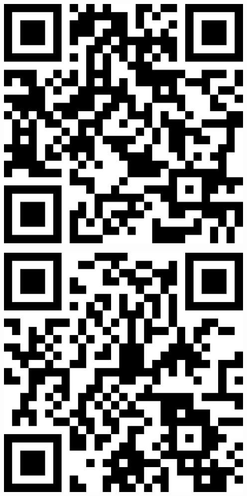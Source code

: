\documentclass[letterpaper]{article}
\begin{document}
 \endgroup 
 \vspace*{\fill} 
 \pagebreak 
{} 
 \vspace*{\fill} 
 \begingroup 
 \centerline{\includegraphics[scale=1,width=5in,height=5in]{Office3657.png}} 
 \endgroup 
 \vspace*{\fill} 
 \pagebreak 
{} 
 \vspace*{\fill} 
 \begingroup 
 \centerline{\includegraphics[scale=1,width=5in,height=5in]{Office3659.png}} 
\end{document}
